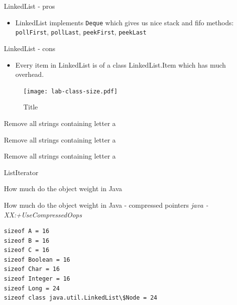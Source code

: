 \documentclass{beamer}
\begin{document}
\begin{frame}{LinkedList - pros}

\begin{itemize}
\item LinkedList implements \texttt{Deque} which gives us nice stack and fifo methods:
 \texttt{pollFirst}, \texttt{pollLast}, \texttt{peekFirst}, \texttt{peekLast}
\end{itemize}

\end{frame}

\begin{frame}{LinkedList - cons}

\begin{itemize}
\item Every item in LinkedList is of a class LinkedList.Item which has much overhead.
\end{itemize}
    \begin{figure}[htbp]
    \centering
        \texttt{[image: lab-class-size.pdf]}
    \caption{Title}
    \label{fig:lab-class-size}
    \end{figure}
\end{frame}

\begin{frame}[fragile]{Remove all strings containing letter a}
    
\end{frame}

\begin{frame}[fragile]{Remove all strings containing letter a}
    
\end{frame}

\begin{frame}[fragile]{Remove all strings containing letter a}
    
\end{frame}

\begin{frame}{ListIterator}
\end{frame}

\lstset{style=srcnormal}
\begin{frame}[fragile]{How much do the object weight in Java}
    
\end{frame}

\begin{frame}[fragile]{How much do the object weight in Java - compressed pointers}
\textit{java -XX:+UseCompressedOops}
    \begin{verbatim}
sizeof A = 16
sizeof B = 16
sizeof C = 16
sizeof Boolean = 16
sizeof Char = 16
sizeof Integer = 16
sizeof Long = 24
sizeof class java.util.LinkedList\$Node = 24
    \end{verbatim}
\end{frame}
\end{document}
